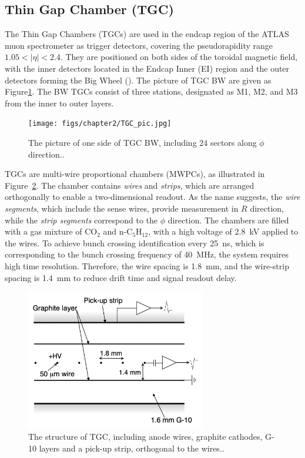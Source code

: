 \subsection{Thin Gap Chamber (TGC)} \label{sec:TGC}
The Thin Gap Chambers (TGCs) are used in the endcap region of the ATLAS muon spectrometer as trigger detectors, covering the pseudorapidity range $1.05 < |\eta| < 2.4$. They are positioned on both sides of the toroidal magnetic field, with the inner detectors located in the Endcap Inner (EI) region and the outer detectors forming the Big Wheel (\BW). The picture of TGC BW are given as Figure\ref{fig:TGC_pic}. The BW TGCs consist of three stations, designated as M1, M2, and M3 from the inner to outer layers.

\begin{figure}[htbp]
  \centering
  \texttt{[image: figs/chapter2/TGC\_pic.jpg]}
  \caption{The picture of one side of TGC BW, including 24 sectors along $\phi$ direction.\cite{TGCInstallation}.}
  \label{fig:TGC_pic}
\end{figure}

TGCs are multi-wire proportional chambers (MWPCs), as illustrated in Figure~\ref{fig:TGC_cross_section}. The chamber contains \textit{wires} and \textit{strips}, which are arranged orthogonally to enable a two-dimensional readout. As the name suggests, the \textit{wire segments}, which include the sense wires, provide measurement in $R$ direction, while the \textit{strip segments} correspond to the $\phi$ direction. The chambers are filled with a gas mixture of CO$_2$ and n-C$_5$H$_{12}$, with a high voltage of 2.8~kV applied to the wires. To achieve bunch crossing identification every 25~ns, which is corresponding to the bunch crossing frequency of 40~MHz, the system requires high time resolution. Therefore, the wire spacing is 1.8~mm, and the wire-strip spacing is 1.4~mm to reduce drift time and signal readout delay.

\begin{figure}[htbp]
  \centering
  \includegraphics[width=0.7\textwidth]{figs/chapter2/TGC_cross_section.png}
  \caption{The structure of TGC, including anode wires, graphite cathodes, G-10 layers and a pick-up strip, orthogonal to the wires.\cite{ATLASDetector2008}.}
  \label{fig:TGC_cross_section}
\end{figure}

